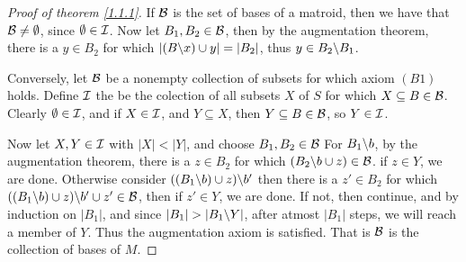 \begin{proof}[Proof of theorem \ref{1.1.1}]
    If $\mathcal{B}$ is the set of bases of a matroid, then we have that  $\mathcal{B} \neq \emptyset$, since
    $\emptyset \in \mathcal{I}$. Now let  $ B_1,B_2 \in \mathcal{B}$, then by the augmentation theorem, there is a
    $y \in B_2$ for which $|(B\backslash x)\cup y|=|B_2|$, thus $y \in B_2\backslash B_1$.

    Conversely, let $\mathcal{B}$ be a nonempty collection of subsets for which axiom $(B1)$ holds. Define
    $\mathcal{I}$ the be the colection of all subsets $X$ of  $S$ for which  $X \subseteq B \in \mathcal{B}$.
    Clearly  $\emptyset \in \mathcal{I}$, and if  $X \in \mathcal{I}$, and  $Y \subseteq X$, then  $Y \subseteq B
    \in \mathcal{B}$, so  $Y \in \mathcal{I}$.

    Now let  $X,Y \in \mathcal{I}$ with  $|X|<|Y|$, and choose  $ B_1,B_2 \in \mathcal{B}$ For $B_1\backslash b$, by
    the augmentation theorem, there is a $z \in B_2$ for which $(B_2\backslash b \cup z) \in \mathcal{B}$. if
    $z \in Y$, we are done. Otherwise consider  $((B_1\backslash b) \cup z)\backslash b'$ then there is a
    $z' \in B_2$ for which $((B_1\backslash b) \cup z)\backslash b' \cup z' \in \mathcal{B}$, then if  $z' \in Y$,
    we are done. If not, then continue, and by induction on  $|B_1|$, and since
    $|B_1|>|\com{B_1}{Y}|$, after atmost $|B_1|$ steps, we will reach a member of $Y$. Thus the
    augmentation axiom is satisfied. That is  $\mathcal{B}$ is the collection of bases of  $M$.
\end{proof}

